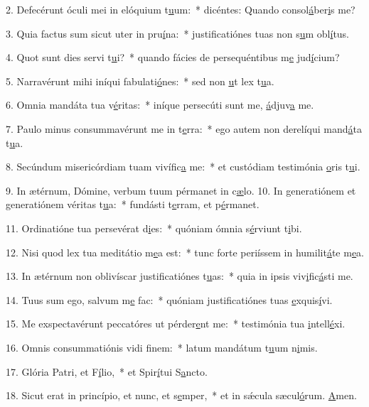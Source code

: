 2. Defecérunt óculi mei in elóquium t\uline{u}um:~* dicéntes: Quando consol\uline{á}ber\uline{i}s me?\par 
3. Quia factus sum sicut uter in pru\uline{í}na:~* justificatiónes tuas non s\uline{u}m obl\uline{í}tus.\par 
4. Quot sunt dies servi t\uline{u}i?~* quando fácies de persequéntibus m\uline{e} jud\uline{í}cium?\par 
5. Narravérunt mihi iníqui fabulati\uline{ó}nes:~* sed non \uline{u}t lex t\uline{u}a.\par 
6. Omnia mandáta tua v\uline{é}ritas:~* iníque persecúti sunt me, \uline{á}djuv\uline{a} me.\par 
7. Paulo minus consummavérunt me in t\uline{e}rra:~* ego autem non derelíqui mand\uline{á}ta t\uline{u}a.\par 
8. Secúndum misericórdiam tuam vivífic\uline{a} me:~* et custódiam testimónia \uline{o}ris t\uline{u}i.\par 
9. In ætérnum, Dómine, verbum tuum pérmanet in c\uline{æ}lo.
10. In generatiónem et generatiónem véritas t\uline{u}a:~* fundásti t\uline{e}rram, et p\uline{é}rmanet.\par 
11. Ordinatióne tua persevérat d\uline{i}es:~* quóniam ómnia s\uline{é}rviunt t\uline{i}bi.\par 
12. Nisi quod lex tua meditátio m\uline{e}a est:~* tunc forte periíssem in humilit\uline{á}te m\uline{e}a.\par 
13. In ætérnum non oblivíscar justificatiónes t\uline{u}as:~* quia in ipsis viv\uline{i}fic\uline{á}sti me.\par 
14. Tuus sum ego, salvum m\uline{e} fac:~* quóniam justificatiónes tuas \uline{e}xquis\uline{í}vi.\par 
15. Me exspectavérunt peccatóres ut pérder\uline{e}nt me:~* testimónia tua \uline{i}ntell\uline{é}xi.\par 
16. Omnis consummatiónis vidi f\uline{i}nem:~* latum mandátum t\uline{u}um n\uline{i}mis.\par 
17. Glória Patri, et F\uline{í}lio,~* et Spir\uline{í}tui S\uline{a}ncto.\par 
18. Sicut erat in princípio, et nunc, et s\uline{e}mper,~* et in sǽcula sæcul\uline{ó}rum. \uline{A}men.\par 
